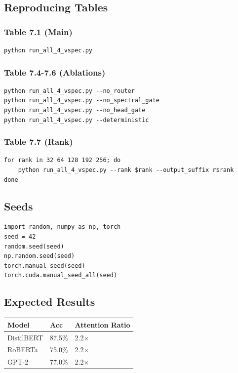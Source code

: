 \subsection{Reproducing Tables}

\subsubsection{Table 7.1 (Main)}
\begin{lstlisting}
python run_all_4_vspec.py
\end{lstlisting}

\subsubsection{Table 7.4-7.6 (Ablations)}
\begin{lstlisting}
python run_all_4_vspec.py --no_router
python run_all_4_vspec.py --no_spectral_gate
python run_all_4_vspec.py --no_head_gate
python run_all_4_vspec.py --deterministic
\end{lstlisting}

\subsubsection{Table 7.7 (Rank)}
\begin{lstlisting}
for rank in 32 64 128 192 256; do
    python run_all_4_vspec.py --rank $rank --output_suffix r$rank
done
\end{lstlisting}

\subsection{Seeds}

\begin{lstlisting}
import random, numpy as np, torch
seed = 42
random.seed(seed)
np.random.seed(seed)
torch.manual_seed(seed)
torch.cuda.manual_seed_all(seed)
\end{lstlisting}

\subsection{Expected Results}

\begin{table}[H]
\centering
\small
\begin{tabular}{lll}
\toprule
\textbf{Model} & \textbf{Acc} & \textbf{Attention Ratio} \\
\midrule
DistilBERT & 87.5\% & 2.2$\times$ \\
RoBERTa & 75.0\% & 2.2$\times$ \\
GPT-2 & 77.0\% & 2.2$\times$ \\
\bottomrule
\end{tabular}
\end{table}


